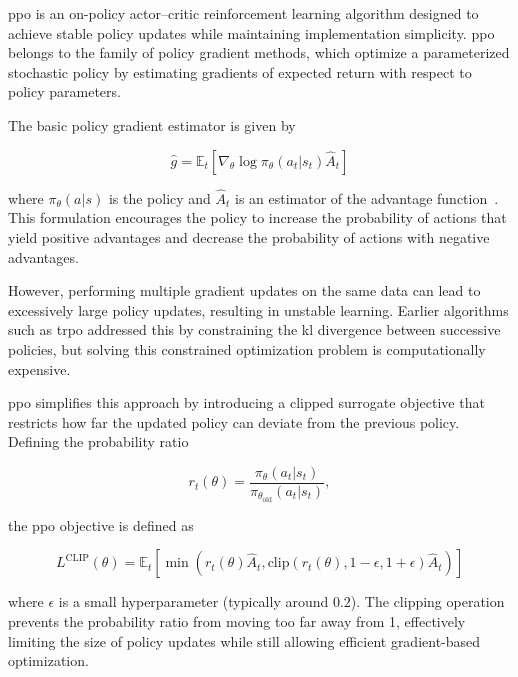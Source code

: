 \gls{ppo} is an on-policy actor–critic reinforcement learning algorithm designed to achieve stable policy updates while maintaining implementation simplicity. \gls{ppo} belongs to the family of policy gradient methods, which optimize a parameterized stochastic policy by estimating gradients of expected return with respect to policy parameters.

The basic policy gradient estimator is given by

\begin{equation} \label{eq:ppo1}
\hat{g} =
\mathbb{E}_t
\left[
\nabla_\theta \log \pi_\theta(a_t|s_t)\hat{A}_t
\right]
\end{equation}

where $\pi_\theta(a|s)$ is the policy and $\hat{A}_t$ is an estimator of the advantage function~\cite{schulman2017}.
This formulation encourages the policy to increase the probability of actions that yield positive advantages and decrease the probability of actions with negative advantages.

However, performing multiple gradient updates on the same data can lead to excessively large policy updates, resulting in unstable learning.
Earlier algorithms such as \gls{trpo} addressed this by constraining the \gls{kl} divergence between successive policies, but solving this constrained optimization problem is computationally expensive.

\gls{ppo} simplifies this approach by introducing a clipped surrogate objective that restricts how far the updated policy can deviate from the previous policy.
Defining the probability ratio

\begin{equation} \label{eq:ppo2}
r_t(\theta) =
\frac{\pi_\theta(a_t|s_t)}{\pi_{\theta_{\text{old}}}(a_t|s_t)},
\end{equation}

the \gls{ppo} objective is defined as

\begin{equation} \label{eq:ppo3}
L^{\text{CLIP}}(\theta) =
\mathbb{E}_t
\left[
\min
\left(
r_t(\theta)\hat{A}_t,
\text{clip}(r_t(\theta), 1-\epsilon, 1+\epsilon)\hat{A}_t
\right)
\right]
\end{equation}

where $\epsilon$ is a small hyperparameter (typically around $0.2$). The clipping operation prevents the probability ratio from moving too far away from 1, effectively limiting the size of policy updates while still allowing efficient gradient-based optimization.

